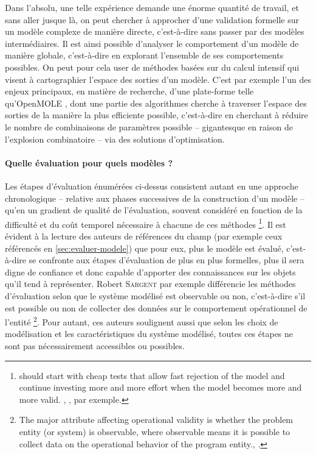 Dans l'absolu, une telle expérience demande une énorme quantité de travail, et sans aller jusque là, on peut chercher à approcher d'une validation formelle sur un modèle complexe de manière directe, c'est-à-dire sans passer par des modèles intermédiaires.
Il est ainsi possible d'analyser le comportement d'un modèle de manière globale, c'est-à-dire en explorant l'ensemble de ses comportements possibles.
On peut pour cela user de méthodes basées sur du calcul intensif qui visent à cartographier \og l'espace des sorties\fg{} d'un modèle.
C'est par exemple l'un des enjeux principaux, en matière de recherche, d'une plate-forme telle qu'OpenMOLE \autocite{reuillon_openmole_2013}, dont une partie des algorithmes \autocite[par exemple][]{cherel_beyond_2015} cherche à traverser l'espace des sorties de la manière la plus efficiente possible, c'est-à-dire en cherchant à réduire le nombre de combinaisons de paramètres possible -- gigantesque en raison de l'explosion combinatoire -- via des solutions d'optimisation.

\paragraph{Quelle évaluation pour quels modèles ?}\label{par:quelle-eval-quel-modeles}

Les étapes d'évaluation énumérées ci-dessus consistent autant en une approche chronologique -- relative aux phases successives de la construction d'un modèle -- qu'en un gradient de qualité de l'évaluation, souvent considéré en fonction de la difficulté et du coût temporel nécessaire à chacune de ces méthodes
\footnote{
	\og [One] should start with cheap tests that allow fast rejection of the model and continue investing more and more effort when the model becomes more and more valid. \fg{}, \textcite[42]{klugl_validation_2008}, par exemple.
}.
Il est évident à la lecture des auteurs de références du champ (par exemple ceux référencés en \cref{sec:evaluer-modele}) que pour eux, \og plus\fg{} le modèle est évalué, c'est-à-dire se confronte aux étapes d'évaluation de plus en plus formelles, plus il sera digne de confiance et donc capable d'apporter des connaissances sur les objets qu'il tend à représenter.
Robert \textsc{Sargent} par exemple différencie les méthodes d'évaluation selon que le système modélisé est observable ou non, c'est-à-dire \og s'il est possible ou non de collecter des données sur le comportement opérationnel de l'entité \fg{}
\footnote{
	\og The major attribute affecting operational validity is whether the problem entity (or system) is observable, where observable means it is possible to collect data on the operational behavior of the program entity.\fg{}, \textcite[6]{sargent2009verification}.
}.
Pour autant, ces auteurs soulignent aussi que selon les choix de modélisation et les caractéristiques du système modélisé, toutes ces étapes ne sont pas nécessairement accessibles ou possibles.

